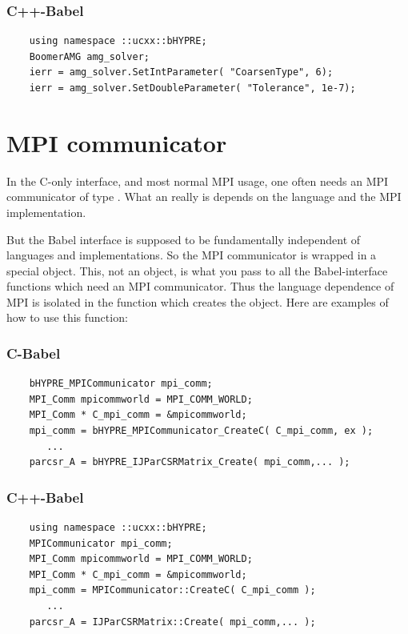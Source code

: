\subsubsection{C++-Babel}
\begin{verbatim}
    using namespace ::ucxx::bHYPRE;
    BoomerAMG amg_solver;
    ierr = amg_solver.SetIntParameter( "CoarsenType", 6);
    ierr = amg_solver.SetDoubleParameter( "Tolerance", 1e-7);
\end{verbatim}

\section{MPI communicator}

In the C-only \hypre{} interface, and most normal MPI usage, one often
needs an MPI communicator of type .  What an
 really is depends on the language and the MPI
implementation.

But the Babel interface is supposed to be fundamentally independent of
languages and implementations.  So the MPI communicator is wrapped in
a special  object.  This, not an
 object, is what you pass to all the Babel-interface
functions which need an MPI communicator.  Thus the language
dependence of MPI is isolated in the function which creates the
 object.  Here are examples of how to use
this function:

\subsubsection{C-Babel}
\begin{verbatim}
    bHYPRE_MPICommunicator mpi_comm;
    MPI_Comm mpicommworld = MPI_COMM_WORLD;
    MPI_Comm * C_mpi_comm = &mpicommworld;
    mpi_comm = bHYPRE_MPICommunicator_CreateC( C_mpi_comm, ex );
       ...
    parcsr_A = bHYPRE_IJParCSRMatrix_Create( mpi_comm,... );
\end{verbatim}

\subsubsection{C++-Babel}
\begin{verbatim}
    using namespace ::ucxx::bHYPRE;
    MPICommunicator mpi_comm;
    MPI_Comm mpicommworld = MPI_COMM_WORLD;
    MPI_Comm * C_mpi_comm = &mpicommworld;
    mpi_comm = MPICommunicator::CreateC( C_mpi_comm );
       ...
    parcsr_A = IJParCSRMatrix::Create( mpi_comm,... );
\end{verbatim}

